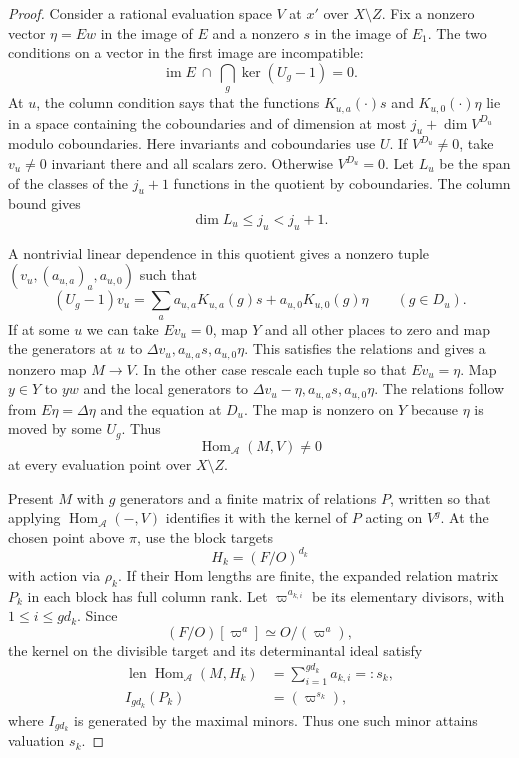 \begin{proof}
Consider a rational evaluation space \(V\) at \(x'\)
over \(X\setminus Z\). Fix a nonzero vector \(\eta=Ew\)
in the image of \(E\) and a nonzero \(s\) in the image
of \(E_1\). The two conditions on a vector in the first image are incompatible:
\[
 \operatorname{im}E\ \cap\ \bigcap_g\ker(U_g-1)=0.
\]
At \(u\), the
column condition says that the functions
\(K_{u,a}(\cdot)s\) and \(K_{u,0}(\cdot)\eta\)
lie in a space containing the coboundaries and of
dimension at most \(j_u+\dim V^{D_u}\) modulo
coboundaries. Here invariants and coboundaries use \(U\).
If \(V^{D_u}\ne0\), take \(v_u\ne0\) invariant there
and all scalars zero. Otherwise \(V^{D_u}=0\). Let \(L_u\) be the span of the classes of the \(j_u+1\) functions in the quotient by coboundaries. The column bound gives
\[
 \dim L_u\le j_u<j_u+1.
\]

A nontrivial linear dependence in this quotient gives a nonzero tuple \((v_u,(a_{u,a})_a,a_{u,0})\)
such that
\[
 (U_g-1)v_u
      =\sum_a a_{u,a}K_{u,a}(g)s+a_{u,0}K_{u,0}(g)\eta
           \qquad(g\in D_u).
\]
If at some \(u\) we can take \(Ev_u=0\), map \(Y\)
and all other places to zero and map the generators
at \(u\) to \(\Delta v_u,a_{u,a}s,a_{u,0}\eta\).
This satisfies the relations and gives a nonzero map
\(M\to V\). In the other case rescale each tuple so
that \(Ev_u=\eta\). Map \(y\in Y\) to \(yw\) and
the local generators to
\(\Delta v_u-\eta,a_{u,a}s,a_{u,0}\eta\).
The relations follow from \(E\eta=\Delta\eta\)
and the equation at \(D_u\). The map is nonzero
on \(Y\) because \(\eta\) is moved by some \(U_g\).
Thus
\[
 \operatorname{Hom}_{\mathcal A}(M,V)\ne0
\]
at every evaluation point over \(X\setminus Z\).

Present \(M\) with \(g\) generators and a finite
matrix of relations \(P\), written so that applying
\(\operatorname{Hom}_{\mathcal A}(-,V)\) identifies it
with the kernel of \(P\) acting on \(V^g\). At the
chosen point above \(\pi\), use the block targets
\[
 H_k=(F/O)^{d_k}
\]
with action via \(\rho_k\).
If their Hom lengths are finite, the expanded relation
matrix \(P_k\) in each block has full column rank.
Let \(\varpi^{a_{k,i}}\) be its elementary divisors, with
\(1\le i\le gd_k\). Since
\[
 (F/O)[\varpi^a]\simeq O/(\varpi^a),
\]
the kernel on the divisible target and its determinantal ideal satisfy
\[
 \begin{aligned}
 \operatorname{len}\operatorname{Hom}_{\mathcal A}(M,H_k)
     &=\sum_{i=1}^{gd_k}a_{k,i}=:s_k,\\
 I_{gd_k}(P_k)&=(\varpi^{s_k}),
 \end{aligned}
\]
where \(I_{gd_k}\) is generated by the maximal minors. Thus one such
minor attains valuation \(s_k\).


\end{proof}
